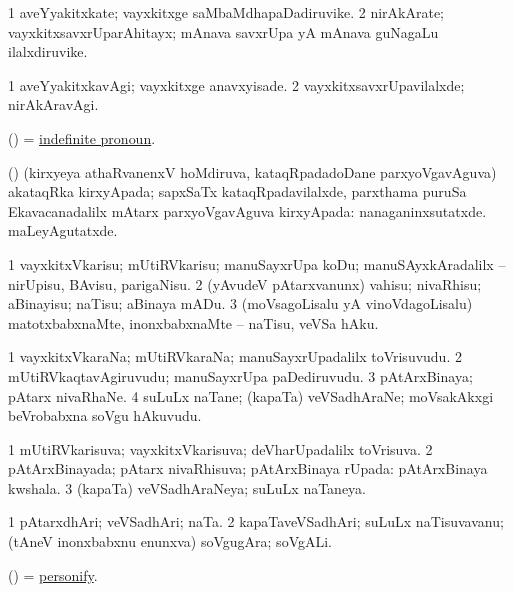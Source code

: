 \bentry
{}
\gl{\nA}
\bmng
\bnum
\num{1} aveYyakitxkate; vayxkitxge saMbaMdhapaDadiruvike. 
\num{2} nirAkArate; vayxkitxsavxrUparAhitayx; mAnava savxrUpa yA mAnava guNagaLu ilalxdiruvike. 
\enum
\emng
\eentry

\bentry
{}
\gl{\kirxvi}
\bmng
\bnum
\num{1} aveYyakitxkavAgi; vayxkitxge anavxyisade. 
\num{2} vayxkitxsavxrUpavilalxde; nirAkAravAgi. 
\enum
\emng
\eentry

\bentry
{}
\gl{\nA}
\bmng
(\vAyx)  = \hyperlink{indefinite pronoun}{indefinite pronoun}. 
\emng
\eentry

\bentry
{}
\gl{\nA}
\bmng
(\vAyx) (kirxyeya athaRvanenxV hoMdiruva, kataqRpadadoDane parxyoVgavAguva) akataqRka kirxyApada; sapxSaTx kataqRpadavilalxde, parxthama puruSa Ekavacanadalilx mAtarx parxyoVgavAguva kirxyApada:  nanaganinxsutatxde.  maLeyAgutatxde. 
\emng
\eentry

\bentry
{}
\gl{\sakirx}
\bmng
\bnum
\num{1} vayxkitxVkarisu; mUtiRVkarisu; manuSayxrUpa koDu; manuSAyxkAradalilx -- nirUpisu, BAvisu, parigaNisu. 
\num{2} (yAvudeV pAtarxvanunx) vahisu; nivaRhisu; aBinayisu; naTisu; aBinaya mADu. 
\num{3} (moVsagoLisalu yA vinoVdagoLisalu) matotxbabxnaMte, inonxbabxnaMte -- naTisu, veVSa hAku. 
\enum
\emng
\eentry

\bentry
{}
\gl{\nA}
\bmng
\bnum
\num{1} vayxkitxVkaraNa; mUtiRVkaraNa; manuSayxrUpadalilx toVrisuvudu. 
\num{2} mUtiRVkaqtavAgiruvudu; manuSayxrUpa paDediruvudu. 
\num{3} pAtArxBinaya; pAtarx nivaRhaNe. 
\num{4} suLuLx naTane; (kapaTa) veVSadhAraNe; moVsakAkxgi beVrobabxna soVgu hAkuvudu. 
\enum
\emng
\eentry

\bentry
{}
\gl{\gu}
\bmng
\bnum
\num{1} mUtiRVkarisuva; vayxkitxVkarisuva; deVharUpadalilx toVrisuva. 
\num{2} pAtArxBinayada; pAtarx nivaRhisuva; pAtArxBinaya rUpada:  pAtArxBinaya kwshala. 
\num{3} (kapaTa) veVSadhAraNeya; suLuLx naTaneya. 
\enum
\emng
\eentry

\bentry
{}
\gl{\nA}
\bmng
\bnum
\num{1} pAtarxdhAri; veVSadhAri; naTa. 
\num{2} kapaTaveVSadhAri; suLuLx naTisuvavanu; (tAneV inonxbabxnu enunxva) soVgugAra; soVgALi. 
\enum
\emng
\eentry

\bentry
{}
\gl{\sakirx}
\bmng
(\pArxparx) = \hyperref{kandict_p.pdf}{P}{personify}{personify}. 
\emng
\eentry

